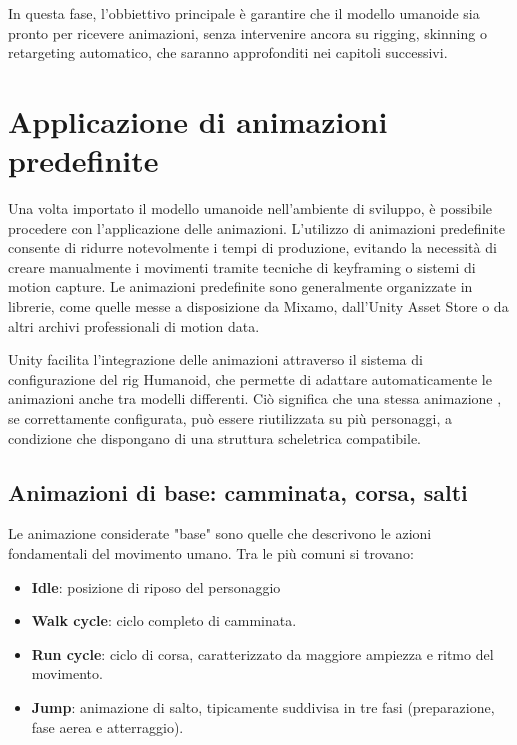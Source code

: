 In questa fase, l'obbiettivo principale è garantire che il modello umanoide sia pronto per ricevere animazioni, senza intervenire ancora su rigging, skinning o retargeting automatico, che saranno approfonditi nei capitoli successivi.

\section{Applicazione di animazioni predefinite}

Una volta importato il modello umanoide nell'ambiente di sviluppo, è possibile procedere con l'applicazione delle animazioni. L'utilizzo di animazioni predefinite consente di ridurre notevolmente i tempi di produzione, evitando la necessità di creare manualmente i movimenti tramite tecniche di keyframing o sistemi di motion capture. Le animazioni predefinite sono generalmente organizzate in librerie, come quelle messe a disposizione da Mixamo, dall'Unity Asset Store o da altri archivi professionali di motion data.

Unity facilita l'integrazione delle animazioni attraverso il sistema di configurazione del rig Humanoid, che permette di adattare automaticamente le animazioni anche tra modelli differenti. Ciò significa che una stessa animazione , se correttamente configurata, può essere riutilizzata su più personaggi, a condizione che dispongano di una struttura scheletrica compatibile.

\subsection{Animazioni di base: camminata, corsa, salti}

Le animazione considerate "base" sono quelle che descrivono le azioni fondamentali del movimento umano. Tra le più comuni si trovano:

\begin{itemize}
    \item \textbf{Idle}: posizione di riposo del personaggio
    \item \textbf{Walk cycle}: ciclo completo di camminata.
    \item \textbf{Run cycle}: ciclo di corsa, caratterizzato da maggiore ampiezza e ritmo del movimento.
    \item \textbf{Jump}: animazione di salto, tipicamente suddivisa in tre fasi (preparazione, fase aerea e atterraggio).
\end{itemize}

